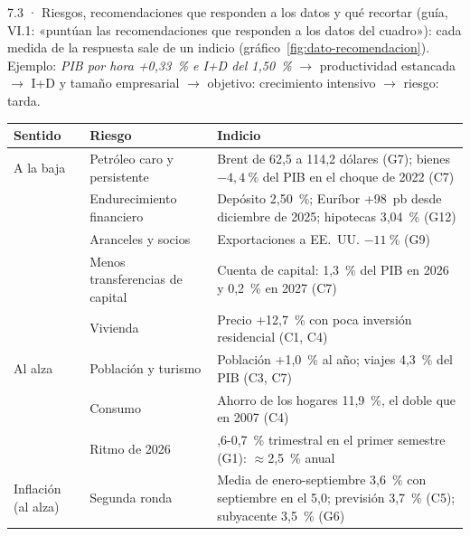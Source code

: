 \begin{complemento}{7.3 · Riesgos, recomendaciones que responden a los datos y qué recortar}
 (guía, VI.1: «puntúan las recomendaciones que responden a los datos del cuadro»): cada medida de la respuesta sale de un indicio (gráfico~\ref{fig:dato-recomendacion}). Ejemplo: \emph{PIB por hora +0,33~\% e I+D del 1,50~\%} $\to$ productividad estancada $\to$ I+D y tamaño empresarial $\to$ objetivo: crecimiento intensivo $\to$ riesgo: tarda.

\begin{figuracaja}
\caption{Del dato a la recomendación (infografía de la guía)}\label{fig:dato-recomendacion}
\end{figuracaja}

\begin{tablacaja}
\centering\scriptsize
\caption{Riesgos de las previsiones de 2026-2027 y su indicio en el cuadernillo}\label{tab:riesgos}
\begin{tabular}{>{\raggedright\arraybackslash}p{1.6cm}>{\raggedright\arraybackslash}p{5.2cm}>{\raggedright\arraybackslash}p{7.0cm}}
\toprule
\rowcolor{tceeazulpalido}
\textbf{Sentido} & \textbf{Riesgo} & \textbf{Indicio} \\
\midrule
A la baja & Petróleo caro y persistente & Brent de 62,5 a 114,2 dólares (G7); bienes $-4{,}4~\%$ del PIB en el choque de 2022 (C7) \\
 & Endurecimiento financiero & Depósito 2,50~\%; Euríbor +98~pb desde diciembre de 2025; hipotecas 3,04~\% (G12) \\
 & Aranceles y socios & Exportaciones a EE.~UU. $-11~\%$ (G9) \\
 & Menos transferencias de capital & Cuenta de capital: 1,3~\% del PIB en 2026 y 0,2~\% en 2027 (C7) \\
 & Vivienda & Precio +12,7~\% con poca inversión residencial (C1, C4) \\
Al alza & Población y turismo & Población +1,0~\% al año; viajes 4,3~\% del PIB (C3, C7) \\
 & Consumo & Ahorro de los hogares 11,9~\%, el doble que en 2007 (C4) \\
 & Ritmo de 2026 & 0,6-0,7~\% trimestral en el primer semestre (G1): $\approx$2,5~\% anual \\
Inflación (al alza) & Segunda ronda & Media de enero-septiembre 3,6~\% con septiembre en el 5,0; previsión 3,7~\% (C5); subyacente 3,5~\% (G6) \\
\bottomrule
\end{tabular}
\end{tablacaja}


\end{complemento}
